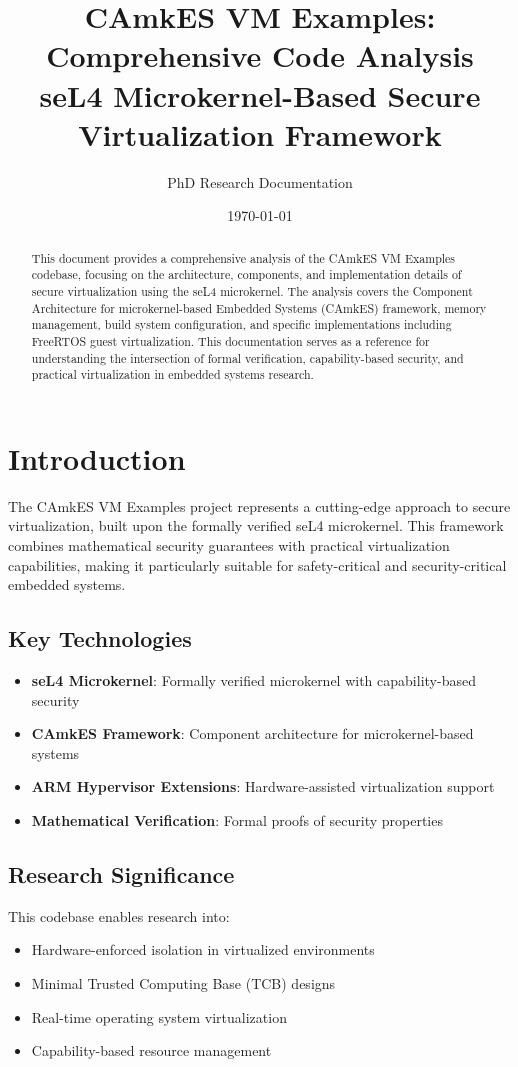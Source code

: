 \documentclass[12pt,a4paper]{article}
\title{\textbf{CAmkES VM Examples: Comprehensive Code Analysis}\\
\large{seL4 Microkernel-Based Secure Virtualization Framework}}
\author{PhD Research Documentation}
\date{\today}
\begin{document}
\maketitle

\begin{abstract}
This document provides a comprehensive analysis of the CAmkES VM Examples codebase, focusing on the architecture, components, and implementation details of secure virtualization using the seL4 microkernel. The analysis covers the Component Architecture for microkernel-based Embedded Systems (CAmkES) framework, memory management, build system configuration, and specific implementations including FreeRTOS guest virtualization. This documentation serves as a reference for understanding the intersection of formal verification, capability-based security, and practical virtualization in embedded systems research.
\end{abstract}

\tableofcontents
\newpage

\section{Introduction}

The CAmkES VM Examples project represents a cutting-edge approach to secure virtualization, built upon the formally verified seL4 microkernel. This framework combines mathematical security guarantees with practical virtualization capabilities, making it particularly suitable for safety-critical and security-critical embedded systems.

\subsection{Key Technologies}
\begin{itemize}
    \item \textbf{seL4 Microkernel}: Formally verified microkernel with capability-based security
    \item \textbf{CAmkES Framework}: Component architecture for microkernel-based systems
    \item \textbf{ARM Hypervisor Extensions}: Hardware-assisted virtualization support
    \item \textbf{Mathematical Verification}: Formal proofs of security properties
\end{itemize}

\subsection{Research Significance}
This codebase enables research into:
\begin{itemize}
    \item Hardware-enforced isolation in virtualized environments
    \item Minimal Trusted Computing Base (TCB) designs
    \item Real-time operating system virtualization
    \item Capability-based resource management
\end{itemize}
\end{document}

